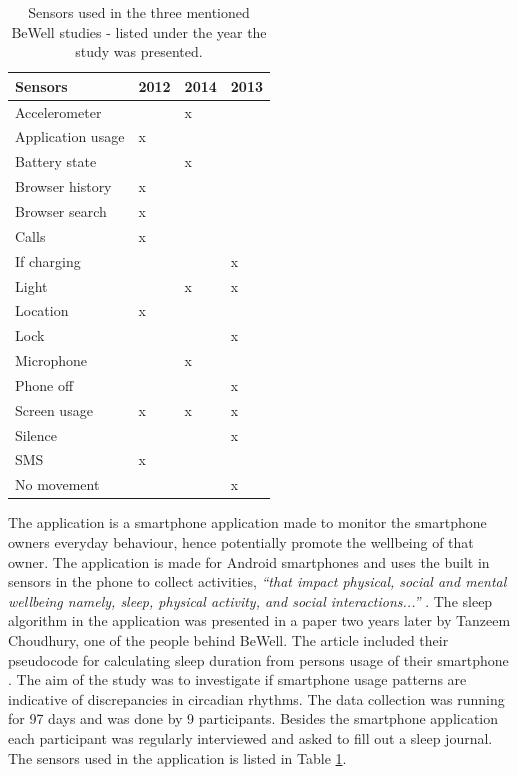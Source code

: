 \documentclass[12pt]{article} %
\begin{document}
\begin{table}
\center
\begin{footnotesize}
	\begin{tabular}{|p{2.8cm} |p{1.2cm} |p{1.2cm} |p{1.2cm} |}
	\hline
	\textbf{Sensors} & \textbf{{\tiny 2012 \cite{beWell}}} & \textbf{{\tiny 2014 \cite{toss}}} & \textbf{{\tiny 2013 \cite{compare}}} \\
	\hline
Accelerometer & & x & \\
Application usage & x & & 	\\
Battery state & & x & \\
Browser history & x & & \\
Browser search & x & & \\	
Calls & x & & \\
If charging & &  & x\\
Light & & x & x\\
Location & x & & \\
Lock & &  & x\\
Microphone & & x &\\
Phone off & &  & x\\
Screen usage & x & x & x\\
Silence & &  & x\\  
SMS & x & & 	\\
No movement & &  & x\\
	\hline
	\end{tabular}
	\caption{Sensors used in the three mentioned BeWell studies - listed under the year the study was presented.}
	\label{tab:sensors}
\end{footnotesize}
\end{table}

The application is a smartphone application made to monitor the smartphone owners everyday behaviour, hence potentially promote the wellbeing of that owner. The application is made for Android smartphones and uses the built in sensors in the phone to collect activities, \textit{``that impact physical, social and mental wellbeing namely, sleep, physical activity, and social interactions...''} \cite{beWell}. The sleep algorithm in the application was presented in a paper two years later by Tanzeem Choudhury, one of the people behind BeWell. The article included their pseudocode for calculating sleep duration from persons usage of their smartphone \cite{bewellSleep}. The aim of the study was to investigate if smartphone usage patterns are indicative of discrepancies in circadian rhythms. The data collection was running for 97 days and was done by 9 participants. Besides the smartphone application each participant was regularly interviewed and asked to fill out a sleep journal. The sensors used in the application is listed in Table \ref{tab:sensors}.\\ 
\end{document}
